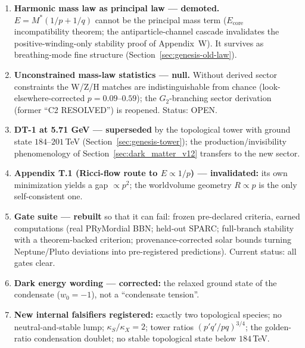 \documentclass[a4paper,12pt]{article}
\begin{document}
\begin{enumerate}
\item \textbf{Harmonic mass law as principal law --- demoted.} $E=M^*(1/p+1/q)$ cannot be the
principal mass term ($E_{\mathrm{core}}$ incompatibility theorem; the antiparticle-channel
cascade invalidates the positive-winding-only stability proof of Appendix~W). It survives as
breathing-mode fine structure (Section~\ref{sec:genesis-old-law}).
\item \textbf{Unconstrained mass-law statistics --- null.} Without derived sector constraints
the W/Z/H matches are indistinguishable from chance (look-elsewhere-corrected
$p=0.09$--$0.59$); the $G_2$-branching sector derivation (former ``C2 RESOLVED'') is
reopened. Status: OPEN.
\item \textbf{DT-1 at 5.71 GeV --- superseded} by the topological tower with ground state
$184$--$201$\,TeV (Section~\ref{sec:genesis-tower}); the production/invisibility
phenomenology of Section~\ref{sec:dark_matter_v12} transfers to the new sector.
\item \textbf{Appendix T.1 (Ricci-flow route to $E\propto 1/p$) --- invalidated:} its own
minimization yields a gap $\propto p^2$; the worldvolume geometry $R\propto p$ is the only
self-consistent one.
\item \textbf{Gate suite --- rebuilt} so that it can fail: frozen pre-declared criteria,
earned computations (real PRyMordial BBN; held-out SPARC; full-branch stability with a
theorem-backed criterion; provenance-corrected solar bounds turning Neptune/Pluto deviations
into pre-registered predictions). Current status: all gates clear.
\item \textbf{Dark energy wording --- corrected:} the relaxed ground state of the condensate
($w_0=-1$), not a ``condensate tension''.
\item \textbf{New internal falsifiers registered:} exactly two topological species; no
neutral-and-stable lump; $\kappa_S/\kappa_X=2$; tower ratios $(p'q'/pq)^{3/4}$; the
golden-ratio condensation doublet; no stable topological state below $184$\,TeV.
\end{enumerate}








\end{document}

